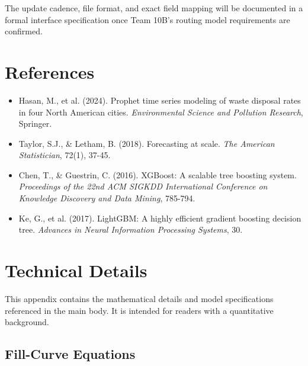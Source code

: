 \documentclass[11pt]{article}
\begin{document}
The update cadence, file format, and exact field mapping will be documented in a formal
interface specification once Team 10B's routing model requirements are confirmed.

\newpage

\section*{References}

\begin{itemize}[label={}, leftmargin=0pt, itemindent=0pt, itemsep=6pt, parsep=0pt]

  \item Hasan, M., et al. (2024). Prophet time series modeling of waste disposal rates in
  four North American cities. \textit{Environmental Science and Pollution Research},
  Springer.

  \item Taylor, S.J., \& Letham, B. (2018). Forecasting at scale.
  \textit{The American Statistician}, 72(1), 37-45.

  \item Chen, T., \& Guestrin, C. (2016). XGBoost: A scalable tree boosting system.
  \textit{Proceedings of the 22nd ACM SIGKDD International Conference on Knowledge
  Discovery and Data Mining}, 785-794.

  \item Ke, G., et al. (2017). LightGBM: A highly efficient gradient boosting decision
  tree. \textit{Advances in Neural Information Processing Systems}, 30.

\end{itemize}

\newpage

\appendix
\section{Technical Details}

This appendix contains the mathematical details and model specifications referenced in the
main body. It is intended for readers with a quantitative background.

\subsection*{Fill-Curve Equations}
\end{document}
